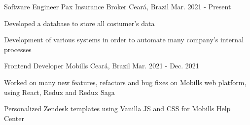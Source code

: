 

\begin{cventries}

  \cventry
    {Software Engineer} %
    {Pax Insurance Broker} %
    {Ceará, Brazil} %
    {Mar. 2021 - Present} %
    {
      \begin{cvitems} %
        \item {Developed a database to store
        all costumer's data}
        \item {Development of various systems in order to automate many company's internal processes}
      \end{cvitems}
    }

  \cventry
    {Frontend Developer} %
    {Mobills} %
    {Ceará, Brazil} %
    {Mar. 2021 - Dec. 2021} %
    {
      \begin{cvitems} %
        \item {Worked on many new features,
        refactors and bug fixes on Mobills
        web platform, using React, Redux
        and Redux Saga}
        \item {Personalized Zendesk templates
        using Vanilla JS and CSS for
        Mobills Help Center}
      \end{cvitems}
    }

\end{cventries}
